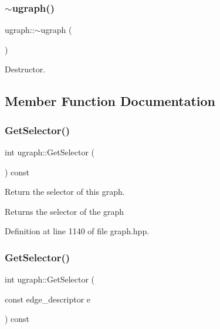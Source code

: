 \subsubsection{\texorpdfstring{$\sim$ugraph()}{~ugraph()}}
{\footnotesize\ttfamily ugraph\+::$\sim$ugraph (\begin{DoxyParamCaption}{ }\end{DoxyParamCaption})\hspace{0.3cm}{\ttfamily [default]}}



Destructor. 



\subsection{Member Function Documentation}
\mbox{\label{structugraph_a6656bc7dea9e67bbae884623e89beab9}} 
\subsubsection{\texorpdfstring{Get\+Selector()}{GetSelector()}\hspace{0.1cm}{\footnotesize\ttfamily [1/2]}}
{\footnotesize\ttfamily int ugraph\+::\+Get\+Selector (\begin{DoxyParamCaption}{ }\end{DoxyParamCaption}) const\hspace{0.3cm}{\ttfamily [inline]}}



Return the selector of this graph. 

\begin{DoxyReturn}{Returns}
the selector of the graph 
\end{DoxyReturn}


Definition at line 1140 of file graph.\+hpp.

\mbox{\label{structugraph_ae606e9e0d909d9658c45f103cbf33d91}} 
\subsubsection{\texorpdfstring{Get\+Selector()}{GetSelector()}\hspace{0.1cm}{\footnotesize\ttfamily [2/2]}}
{\footnotesize\ttfamily int ugraph\+::\+Get\+Selector (\begin{DoxyParamCaption}\item[{const edge\+\_\+descriptor}]{e }\end{DoxyParamCaption}) const\hspace{0.3cm}{\ttfamily [inline]}}



